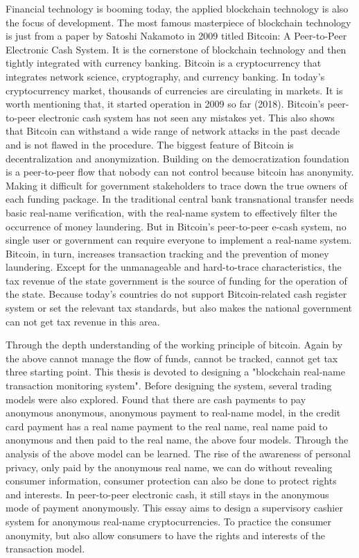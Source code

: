 \begin{eabstract}
	Financial technology is booming today, the applied blockchain technology is also the focus of development. The most famous masterpiece of blockchain technology is just from a paper by Satoshi Nakamoto in 2009 titled Bitcoin: A Peer-to-Peer Electronic Cash System. It is the cornerstone of blockchain technology and then tightly integrated with currency banking. Bitcoin is a cryptocurrency that integrates network science, cryptography, and currency banking. In today's cryptocurrency market, thousands of currencies are circulating in markets. It is worth mentioning that, it started operation in 2009 so far (2018). Bitcoin's peer-to-peer electronic cash system has not seen any mistakes yet. This also shows that Bitcoin can withstand a wide range of network attacks in the past decade and is not flawed in the procedure. The biggest feature of Bitcoin is decentralization and anonymization. Building on the democratization foundation is a peer-to-peer flow that nobody can not control because bitcoin has anonymity. Making it difficult for government stakeholders to trace down the true owners of each funding package. In the traditional central bank transnational transfer needs basic real-name verification, with the real-name system to effectively filter the occurrence of money laundering. But in Bitcoin's peer-to-peer e-cash system, no single user or government can require everyone to implement a real-name system. Bitcoin, in turn, increases transaction tracking and the prevention of money laundering. Except for the unmanageable and hard-to-trace characteristics, the tax revenue of the state government is the source of funding for the operation of the state. Because today's countries do not support Bitcoin-related cash register system or set the relevant tax standards, but also makes the national government can not get tax revenue in this area. 


	Through the depth understanding of the working principle of bitcoin. Again by the above cannot manage the flow of funds, cannot be tracked, cannot get tax three starting point. This thesis is devoted to designing a "blockchain real-name transaction monitoring system". Before designing the system, several trading models were also explored. Found that there are cash payments to pay anonymous anonymous, anonymous payment to real-name model, in the credit card payment has a real name payment to the real name, real name paid to anonymous and then paid to the real name, the above four models. Through the analysis of the above model can be learned. The rise of the awareness of personal privacy, only paid by the anonymous real name, we can do without revealing consumer information, consumer protection can also be done to protect rights and interests. In peer-to-peer electronic cash, it still stays in the anonymous mode of payment anonymously. This essay aims to design a supervisory cashier system for anonymous real-name cryptocurrencies. To practice the consumer anonymity, but also allow consumers to have the rights and interests of the transaction model. 

\end{eabstract}

